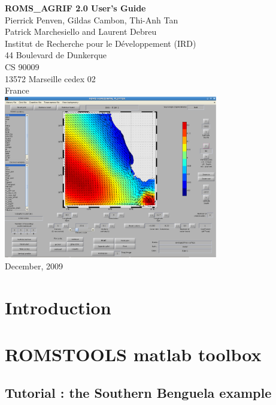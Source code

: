 \documentclass[11pt]{book}
\begin{document}
\thispagestyle{empty}
\pagestyle{plain}
\begin{center}
\vspace{3 cm}
{\huge \bf ROMS\_AGRIF 2.0 User's Guide }\\
\vspace{2 cm}
{\Large Pierrick Penven, Gildas Cambon, Thi-Anh Tan \\ 
Patrick Marchesiello and Laurent Debreu}\\ 
\vspace{1 cm}
{\Large Institut de Recherche pour le D\'eveloppement (IRD)}\\
\vspace{0.5 cm}
{\large 44 Boulevard de Dunkerque} \\
{\large CS 90009} \\
{\large 13572 Marseille cedex 02} \\
{\Large France} \\
\vspace{2cm}
\includegraphics[width=0.7\textwidth]{roms_gui2.eps}
\vspace{1cm} \\
{December, 2009}
\end{center}
\chapter*{Introduction}

\newpage
\tableofcontents
\newpage
\chapter{ROMSTOOLS matlab toolbox}



\section{Tutorial : the Southern Benguela example}

\end{document}
